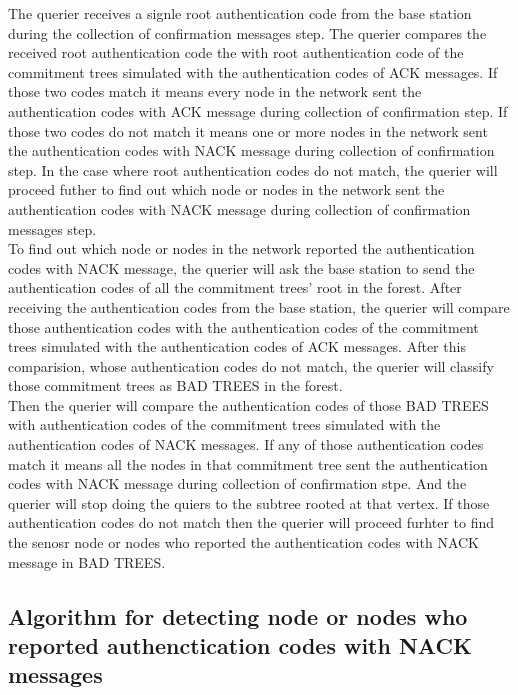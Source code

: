 The querier receives a signle root authentication code from the base station during the collection of confirmation messages step. The querier compares the received root authentication code the with root authentication code of the commitment trees simulated with the authentication codes of ACK messages. If those two codes match it means every node in the network sent the authentication codes with ACK message during collection of confirmation step. If those two codes do not match it means one or more nodes in the network sent the authentication codes with NACK message during collection of confirmation step. In the case where root authentication codes do not match, the querier will proceed futher to find out which node or nodes in the network sent the authentication codes with NACK message during collection of confirmation messages step.\\


To find out which node or nodes in the network reported the authentication codes with NACK message, the querier will ask the base station to send the authentication codes of all the commitment trees' root in the forest. After receiving the authentication codes from the base station, the querier will compare those authentication codes with the authentication codes of the commitment trees simulated with the authentication codes of ACK messages. After this comparision, whose authentication codes do not match, the querier will classify those commitment trees as BAD TREES in the forest. \\


Then the querier will compare the authentication codes of those BAD TREES with authentication codes of the commitment trees simulated with the authentication codes of NACK messages. If any of those authentication codes match it means all the nodes in that commitment tree sent the authentication codes with NACK message during collection of confirmation stpe. And the querier will stop doing the quiers to the subtree rooted at that vertex. If those authentication codes do not match then the querier will proceed furhter to find the senosr node or nodes who reported the authentication codes with NACK message in BAD TREES.\\


\subsection{Algorithm for detecting node or nodes who reported authenctication codes with NACK messages }

